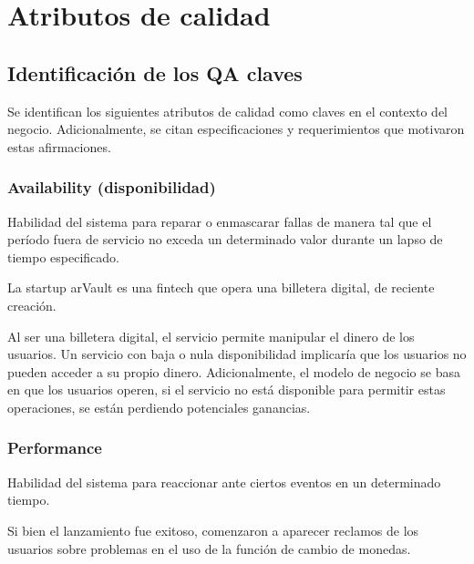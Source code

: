 \section{Atributos de calidad}
\label{sec:atributos_de_calidad}

    \subsection{Identificación de los QA claves}
    \label{sec:identificacion_de_los_qa_claves}

        Se identifican los siguientes atributos de calidad como claves en el contexto del negocio.
        Adicionalmente, se citan especificaciones y requerimientos que motivaron estas afirmaciones.

        \subsubsection{Availability (disponibilidad)}
        \label{sec:disponibilidad}

            Habilidad del sistema para reparar o enmascarar fallas de manera tal que el período fuera de servicio no exceda un determinado valor durante un lapso de tiempo especificado.

            \begin{customenv}[frametitle=]
                La startup arVault es una fintech que opera una billetera digital, de reciente creación.
            \end{customenv}

            Al ser una billetera digital, el servicio permite manipular el dinero de los usuarios. Un servicio con baja o nula disponibilidad implicaría que los usuarios no pueden acceder a su propio dinero.
            Adicionalmente, el modelo de negocio se basa en que los usuarios operen, si el servicio no está disponible para permitir estas operaciones, se están perdiendo potenciales ganancias.

        \subsubsection{Performance}
        \label{sec:performance}

            Habilidad del sistema para reaccionar ante ciertos eventos en un determinado tiempo.

            \begin{customenv}[frametitle=]
                Si bien el lanzamiento fue exitoso, comenzaron a aparecer reclamos de los usuarios sobre problemas en el uso de la función de cambio de monedas.
            \end{customenv}

